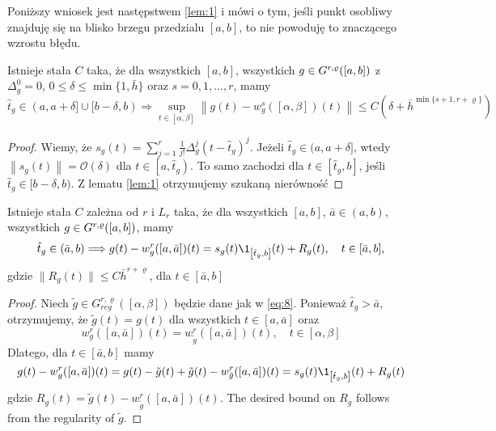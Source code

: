 \documentclass[oik, pdftex, robocza, man]{mgrwms}
\begin{document}
    Poniższy wniosek jest następstwem \eqref{lem:1} i mówi o tym, jeśli punkt osobliwy znajduję się na blisko brzegu przedzialu $[a,b]$, to nie powoduję to znaczącego wzrostu błędu.

    \begin{cor}
        Istnieje stała $C$ taka, że dla wszystkich $[a,b]$, wszystkich $g \in G^{r,\varrho}([a,b])$ z $\Delta_{g}^{0} = 0$, $0 \leq \delta \leq \min \{1, \bar{h}\}$ oraz $s=0,1,\dots,r$, mamy
        \begin{equation*}
            \hat{t}_{g} \in(a, a+\delta] \cup[b-\delta, b) \Longrightarrow  \sup_{t \in[\alpha, \beta]}\left\|g(t)-w_{g}^{s}([\alpha, \beta])(t)\right\| \leq C\left(\delta+\bar{h}^{\min \{s+1, r+\varrho\}}\right)
        \end{equation*}
    \end{cor}
    \begin{proof}
        Wiemy, że $s_{g}(t)=\sum_{j=1}^{r} \frac{1}{j !} \Delta_{g}^{j}\left(t-\hat{t}_{g}\right)^{j}$. Jeżeli $\hat{t}_{g} \in(a, a+\delta]$, wtedy $\left\|s_{g}(t)\right\|=\mathcal{O}(\delta)$ dla $t \in\left[a, \hat{t}_{g}\right) .$ To samo zachodzi dla $t \in\left[\hat{t}_{g}, b\right]$, jeśli $\hat{t}_{g} \in[b-\delta, b)$. Z lematu \eqref{lem:1} otrzymujemy szukaną nierówność
    \end{proof}

    \begin{lemma} \label{lem:2}
        Istnieje stała $C$ zależna od $r$ i $L_{r}$ taka, że dla wszystkich $[a,b]$, $\bar{a} \in (a,b)$, wszystkich $g \in G^{r,\varrho}([a,b])$, mamy
        \begin{equation*}
            \hat{t}_{g} \in(\bar{a}, b) \Longrightarrow g(t)-w_{g}^{r}([a, \bar{a}])(t)=s_{g}(t) \1_{\left[\hat{t}_{g}, b\right]}(t)+R_{g}(t), \quad t \in[\bar{a}, b],
        \end{equation*}
        gdzie $\| R_{g}(t) \| \leq C\bar{h}^{r+\varrho}$, dla $t \in [\bar{a}, b]$
    \end{lemma}
    \begin{proof}
        Niech $\tilde{g} \in G_{reg}^{r, \varrho}([\alpha, \beta])$ będzie dane jak w \eqref{eq:8}. Ponieważ $\hat{t}_{g}>\bar{a}$, otrzymujemy, że $\tilde{g}(t)=g(t)$ dla wszystkich $t \in[a, \bar{a}]$ oraz
        \begin{equation*}
            w_{g}^{r}([a, \bar{a}])(t)=w_{\tilde{g}}^{r}([a, \bar{a}])(t), \quad t \in[\alpha, \beta]
        \end{equation*}
        Dlatego, dla $t \in[\bar{a}, b]$ mamy
        \begin{equation}
            g(t)-w_{g}^{r}([a, \bar{a}])(t)=g(t)-\tilde{g}(t)+\tilde{g}(t)-w_{\tilde{g}}^{r}([a, \bar{a}])(t)=s_{g}(t) \1_{\left[\hat{t}_{g}, b\right]}(t)+R_{g}(t)
        \end{equation}
        gdzie $R_{g}(t)=\tilde{g}(t)-w_{\tilde{g}}^{r}([a, \bar{a}])(t) .$ The desired bound on $R_{g}$ follows from the regularity of $\tilde{g}$.    
    \end{proof}
\end{document}
